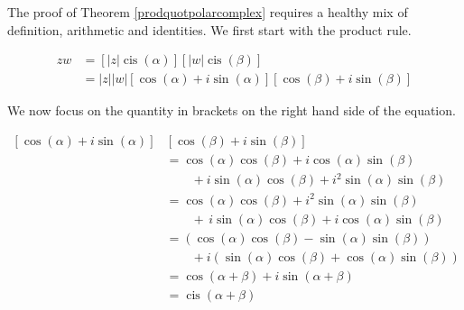 \medskip


The proof of Theorem \ref{prodquotpolarcomplex} requires a healthy mix of definition, arithmetic and identities.  We first start with the product rule.

\begin{align*}
zw & =  \left[|z|\operatorname{cis}(\alpha)\right] \left[|w|\operatorname{cis}(\beta)\right]  \\[3pt]
   & =  |z||w|\left[\cos(\alpha) + i\sin(\alpha)\right]\left[\cos(\beta) + i \sin(\beta)\right]
\end{align*}

We now focus on the quantity in brackets on the right hand side of the equation.

\begin{align*}
\left[\cos(\alpha) + i\sin(\alpha)\right]&\left[\cos(\beta) + i \sin(\beta)\right]\\
 & = \cos(\alpha)\cos(\beta) + i\cos(\alpha)\sin(\beta) \\	
 & \quad\quad + i\sin(\alpha)\cos(\beta) + i^2 \sin(\alpha)\sin(\beta) \\																		 & =  \cos(\alpha)\cos(\beta) +  i^2 \sin(\alpha) \sin(\beta) \tag*{Rearranging terms}  \\
 & \quad\quad + \, i\sin(\alpha)\cos(\beta) +i\cos(\alpha)\sin(\beta)  \\
 & =  \left(\cos(\alpha)\cos(\beta) - \sin(\alpha) \sin(\beta)\right)\tag*{Since $i^2 = -1$}\\
 &  \quad\quad + i\left(\sin(\alpha)\cos(\beta)+ \cos(\alpha)\sin(\beta)\right)  \tag*{Factor out $i$}\\	
 & = \cos(\alpha + \beta) + i \sin(\alpha+\beta)  \tag*{Sum identities} \\
 & = \operatorname{cis}(\alpha + \beta)  \tag*{Definition of `cis'}
\end{align*}

